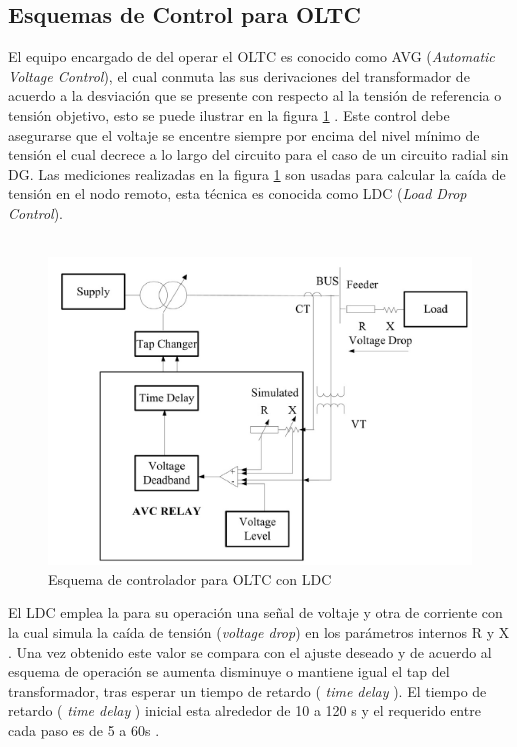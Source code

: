 \documentclass[12pt, letterpaper]{report}
\begin{document}
\subsection{Esquemas de Control para OLTC}
El equipo encargado de del operar el OLTC es conocido como AVG (\textit{Automatic Voltage Control}), el cual conmuta las sus derivaciones del transformador de acuerdo a la desviación que se presente con respecto al la tensión de referencia o tensión objetivo, esto se puede ilustrar en la figura \ref{fig:esqusema_LDC} \cite{Sarimuthu2016}. Este control debe asegurarse que el voltaje se encentre siempre por encima del nivel mínimo de tensión el cual decrece a lo largo del circuito \cite{Sarimuthu2016} para el caso de un circuito radial sin DG. Las  mediciones realizadas en la figura \ref{fig:esqusema_LDC} son usadas para calcular la caída de tensión en el nodo remoto, esta técnica es conocida como LDC (\textit{Load Drop Control}).\\\\

\begin{figure}[h]
\centering
\caption{Esquema de controlador para OLTC con LDC \cite{Sarimuthu2016}}
\label{fig:esqusema_LDC}
\includegraphics[width=0.7\linewidth]{imagenes/cap_2/LDC}
\end{figure}
El LDC emplea la para su operación una señal de voltaje  y otra de corriente con la cual  simula la caída de tensión (\textit{voltage drop})  en los parámetros internos R  y X \cite{Sarimuthu2016}. Una vez obtenido este valor  se compara con el ajuste deseado y de acuerdo al esquema de operación se aumenta disminuye o mantiene igual el tap del  transformador, tras esperar un tiempo de retardo ( \textit{time delay} ). El tiempo de retardo ( \textit{time delay} ) inicial esta alrededor de 10  a 120 s y el requerido entre cada paso  es de 5 a 60s  \cite{Sarimuthu2016}.\\\\
\end{document}

